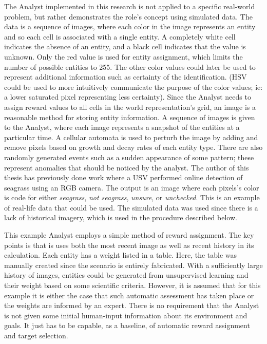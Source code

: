 \documentclass{tamuccthesis}
\begin{document}
The Analyst implemented in this research is not applied to a specific real-world problem, but rather demonstrates the role's concept using simulated data. The data is a sequence of images, where each color in the image represents an entity and so each cell is associated with a single entity. A completely white cell indicates the absence of an entity, and a black cell indicates that the value is unknown. Only the red value is used for entity assignment, which limits the number of possible entities to 255. The other color values could later be used to represent additional information such as certainty of the identification. (HSV could be used to more intuitively communicate the purpose of the color values; ie: a lower saturated pixel representing less certainty). Since the Analyst needs to assign reward values to all cells in the world representation's grid, an image is a reasonable method for storing entity information. A sequence of images is given to the Analyst, where each image represents a snapshot of the entities at a particular time. A cellular automata is used to perturb the image by adding and remove pixels based on growth and decay rates of each entity type. There are also randomly generated events such as a sudden appearance of some pattern; these represent anomalies that should be noticed by the analyst. The author of this thesis has previously done work where a USV performed online detection of seagrass using an RGB camera. The output is an image where each pixels's color is code for either \textit{seagrass}, \textit{not seagrass}, \textit{unsure}, or \textit{unchecked}. This is an example of real-life data that could be used. The simulated data was used since there is a lack of historical imagery, which is used in the procedure described below. 

This example Analyst employs a simple method of reward assignment. The key points is that is uses both the most recent image as well as recent history in its calculation. Each entity has a weight listed in a table. Here, the table was manually created since the scenario is entirely fabricated. With a sufficiently large history of images, entities could be generated from unsupervised learning and their weight based on some scientific criteria. However, it is assumed that for this example it is either the case that such automatic assessment has taken place or the weights are informed by an expert. There is no requirement that the Analyst is not given some initial human-input information about its environment and goals. It just has to be capable, as a baseline, of automatic reward assignment and target selection. 
\end{document}
